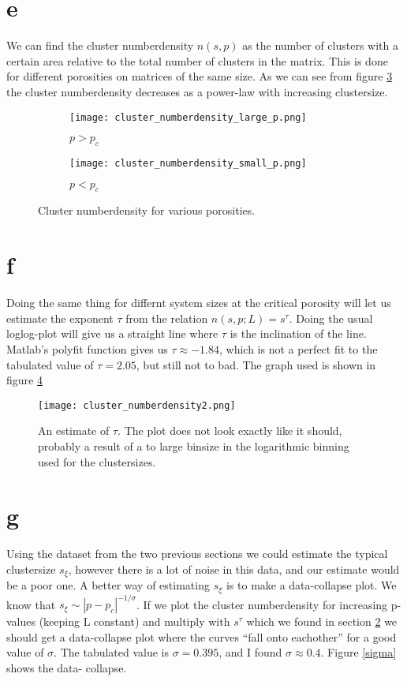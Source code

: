\documentclass[a4paper,english, 10pt, twoside]{article}
\begin{document}
\section{e}
We can find the cluster numberdensity $n(s,p)$ as the number of clusters with a certain area relative to the 
total number of clusters in the matrix. This is done for different porosities on matrices of the same size. As 
we can see from figure \ref{clustersize} the cluster numberdensity decreases as a power-law with increasing clustersize.
\begin{figure}[H]
\centering
  \begin{subfigure}[b]{0.48\textwidth}
    \texttt{[image: cluster\_numberdensity\_large\_p.png]}
    \caption{$p > p_c$}
    \label{clustersize:larger}
  \end{subfigure}
  \begin{subfigure}[b]{0.48\textwidth}
    \texttt{[image: cluster\_numberdensity\_small\_p.png]}
    \label{clustersize:smaller}
    \caption{$p < p_c$}
  \end{subfigure} 
  \caption{Cluster numberdensity for various porosities.}
  \label{clustersize}
\end{figure}

\section{f}\label{sect_f}

Doing the same thing for differnt system sizes at the critical porosity will let us estimate the exponent $\tau$ from 
the relation $n(s,p;L) = s^\tau$. Doing the usual loglog-plot will give us a straight line where $\tau$ is the 
inclination of the line. Matlab's polyfit function gives us $\tau \approx -1.84$, which is not a perfect fit to the 
tabulated value of $\tau = 2.05$, but still not to bad. The graph used is shown in figure \ref{tau}

\begin{figure}[H]
 \centering
 \texttt{[image: cluster\_numberdensity2.png]}
 \caption{An estimate of $\tau$. The plot does not look exactly like it should, probably a result of a 
 to large binsize in the logarithmic binning used for the clustersizes.}
 \label{tau}
\end{figure}

\section{g}
Using the dataset from the two previous sections we could estimate the typical clustersize $s_\xi$, however 
there is a lot of noise in this data, and our estimate would be a poor one. A better way of estimating $s_\xi$ 
is to make a data-collapse plot. We know that $s_\xi \sim |p-p_c|^{-1/\sigma}$. If we plot the cluster 
numberdensity for increasing p-values (keeping L constant) and multiply with $s^\tau$ which we found in section 
\ref{sect_f} we should get a data-collapse plot where the curves ``fall onto eachother'' for a good value of $\sigma$. 
The tabulated value is $\sigma = 0.395$, and I found $\sigma \approx 0.4$. Figure \ref{sigma} shows the data-
collapse.
\end{document}

